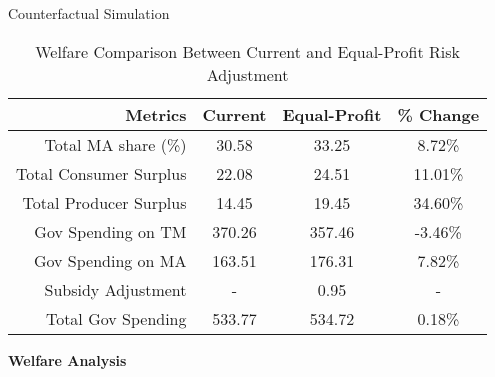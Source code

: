 \documentclass{beamer}
\begin{document}
\begin{frame}[t]
\begin{columns}[t]
\begin{column}{.3 \textwidth}
\begin{block}{Counterfactual Simulation}
        \begin{table}[ht]
          \small
          \centering
          \caption{Welfare Comparison Between Current and Equal-Profit Risk Adjustment}
          \label{tab:counterfactual}
          \begin{threeparttable}
            \renewcommand{\arraystretch}{1.2}
            \begin{tabular}{@{}rccc@{}}
              \toprule
              \textbf{Metrics} & \textbf{Current} & \textbf{Equal-Profit} & \textbf{\% Change} \\ \midrule
              Total MA share (\%) & 30.58 & 33.25 & 8.72\% \\
              Total Consumer Surplus & 22.08 & 24.51 & 11.01\% \\
              Total Producer Surplus & 14.45 & 19.45 & 34.60\% \\
              Gov Spending on TM & 370.26 & 357.46 & -3.46\% \\
              Gov Spending on MA & 163.51 & 176.31 & 7.82\% \\
              Subsidy Adjustment & - & 0.95 & - \\
              Total Gov Spending & 533.77 & 534.72 & 0.18\% \\
              \bottomrule
            \end{tabular}
          \end{threeparttable}

        \end{table}
        \begin{center}
          \textbf{Welfare Analysis}
        \end{center}
        

\end{block}
\end{column}
\end{columns}
\end{frame}
\end{document}
